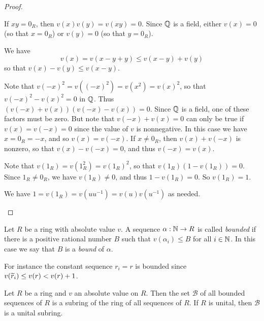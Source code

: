 \begin{proof}
\begin{inlineproplist}
\item If \(xy = 0_R\), then \(v(x)v(y) = v(xy) = 0\).
Since \(\mathbb{Q}\) is a field, either \(v(x) = 0\) (so that \(x = 0_R\)) or \(v(y) = 0\) (so that \(y = 0_R\)).
\item We have \[ v(x) = v(x-y+y) \leq v(x-y) + v(y) \] so that \(v(x) - v(y) \leq v(x-y)\).
\item Note that \(v(-x)^2 = v((-x)^2) = v(x^2) = v(x)^2\), so that \(v(-x)^2 - v(x)^2 = 0\) in \(\mathbb{Q}\).
Thus \((v(-x) + v(x))(v(-x) - v(x)) = 0\).
Since \(\mathbb{Q}\) is a field, one of these factors must be zero.
But note that \(v(-x) + v(x) = 0\) can only be true if \(v(x) = v(-x) = 0\) since the value of \(v\) is nonnegative.
In this case we have \(x = 0_R = -x\), and so \(v(x) = v(-x)\).
If \(x \neq 0_R\), then \(v(x) + v(-x)\) is nonzero, so that \(v(x) - v(-x) = 0\), and thus \(v(-x) = v(x)\).
\item Note that \(v(1_R) = v(1_R^2) = v(1_R)^2\), so that \(v(1_R)(1 - v(1_R)) = 0\).
Since \(1_R \neq 0_R\), we have \(v(1_R) \neq 0\), and thus \(1 - v(1_R) = 0\).
So \(v(1_R) = 1\).
\item We have \(1 = v(1_R) = v(uu^{-1}) = v(u)v(u^{-1})\) as needed.
\end{inlineproplist}
\end{proof}

\begin{dfn}
Let \(R\) be a ring with absolute value \(v\). A sequence \(\alpha : \mathbb{N} \rightarrow R\) is called \emph{bounded} if there is a positive rational number \(B\) such that \(v(\alpha_i) \leq B\) for all \(i \in \mathbb{N}\). In this case we say that \(B\) is a \emph{bound} of \(\alpha\).
\end{dfn}

For instance the constant sequence \(r_i = r\) is bounded since \(v(\widetilde{r}_i) \leq v(r) < v(r) + 1\).

\begin{prop}
Let \(R\) be a ring and \(v\) an absolute value on \(R\).
Then the set \(\mathcal{B}\) of all bounded sequences of \(R\) is a subring of the ring of all sequences of \(R\).
If \(R\) is unital, then \(\mathcal{B}\) is a unital subring.
\end{prop}

